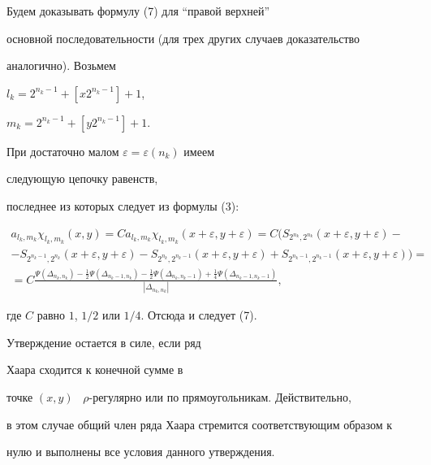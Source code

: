 \begin{pf}


Будем доказывать формулу (7) для ``правой верхней''


основной последовательности (для трех других случаев доказательство


аналогично). Возьмем 


$l_k=2^{n_k-1}+[x2^{n_k-1}]+1$,     


$m_k=2^{n_k-1}+[y2^{n_k-1}]+1$. 





При достаточно малом $\varepsilon=\varepsilon(n_k)$ имеем 


следующую цепочку равенств, 


последнее из которых следует из формулы (3):


\begin{gather*}


a_{l_k,m_k}\chi_{l_k,m_k}(x,y)=Ca_{l_k,m_k}\chi_{l_k,m_k}


(x+\varepsilon,y+\varepsilon)=


C(S_{2^{n_k}, 2^{n_k}}(x+\varepsilon,y+\varepsilon)-\\


%


-S_{2^{n_k-1}, 2^{n_k}}(x+\varepsilon,y+\varepsilon)-


S_{2^{n_k}, 2^{n_k-1}}(x+\varepsilon,y+\varepsilon)+


S_{2^{n_k-1}, 2^{n_k-1}}(x+\varepsilon,y+\varepsilon))= \\




=C\displaystyle\frac


{\Psi(\Delta_{n_k,n_k})-\frac{1}{2}\Psi(\Delta_{n_k-1,n_k})


-\frac{1}{2}\Psi(\Delta_{n_k,n_k-1})


+\frac{1}{4}\Psi(\Delta_{n_k-1,n_k-1})}


{|\Delta_{n_k,n_k}|},


\end{gather*}


где $C$ равно $1$, $1/2$ или $1/4$. Отсюда и следует (7). 


\end{pf}


 


\begin{note}


Утверждение остается в силе, если ряд 


Хаара сходится к конечной сумме в


точке $(x,y)$ \ $\rho$-регулярно или по прямоугольникам. Действительно, 


в этом случае общий член ряда Хаара стремится соответствующим образом к 


нулю и выполнены все условия данного утверждения. 


\end{note}


